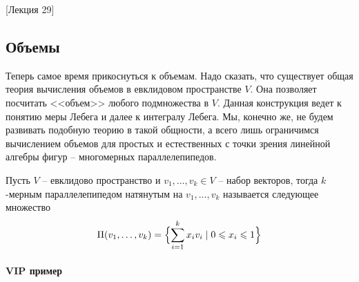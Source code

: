 [Лекция 29]


\subsection{Объемы}

Теперь самое время прикоснуться к объемам.
Надо сказать, что существует общая теория вычисления объемов в евклидовом пространстве $V$.
Она позволяет посчитать <<объем>> любого подмножества в $V$.
Данная конструкция ведет к понятию меры Лебега и далее к интегралу Лебега.
Мы, конечно же, не будем развивать подобную теорию в такой общности, а всего лишь ограничимся вычислением объемов для простых и естественных с точки зрения линейной алгебры фигур -- многомерных параллелепипедов.

\begin{definition}
Пусть $V$ -- евклидово пространство и $v_1,\ldots,v_k\in V$ -- набор векторов, тогда $k$-мерным параллелепипедом натянутым на $v_1,\ldots,v_k$ называется следующее множество
\[
\Pi(v_1,\ldots,v_k) = \Bigl\{\sum_{i=1}^k x_i v_i\mid 0\leqslant x_i \leqslant 1\Bigl\}
\]
\end{definition}

\paragraph{VIP пример}

